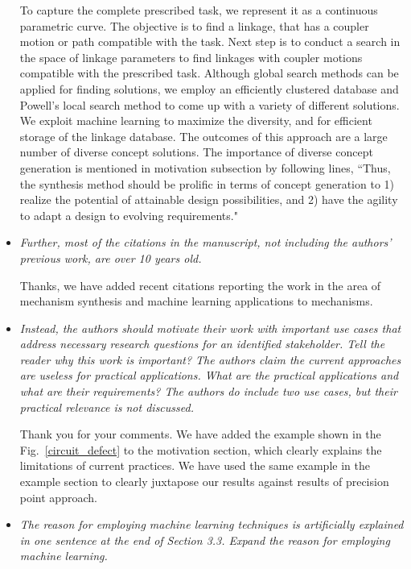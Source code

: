 \documentclass{article}
\begin{document}
\begin{itemize}
To capture the complete prescribed task, we represent it as a continuous parametric curve.
The objective is to find a linkage, that has a coupler motion or path compatible with the task.
Next step is to conduct a search in the space of linkage parameters to find linkages with coupler motions compatible with the prescribed task.
Although global search methods can be applied for finding solutions, we employ an efficiently clustered database and Powell's local search method to come up with a variety of different solutions.
We exploit machine learning to maximize the diversity, and for efficient storage of the linkage database.
The outcomes of this approach are a large number of diverse concept solutions.
The importance of diverse concept generation is mentioned in motivation subsection by following lines,
``Thus, the synthesis method should be prolific in terms of concept generation to 1) realize the potential of attainable design possibilities, and 2) have the agility to adapt a design to evolving requirements."
\\

  \item \emph{
Further, most of the citations in the manuscript, not including the authors' previous work, are over 10 years old.
}

Thanks, we have added recent citations reporting the work in the area of mechanism synthesis and machine learning applications to mechanisms.
\\

  \item \emph{
Instead, the authors should motivate their work with important use cases that address necessary research questions for an identified stakeholder. Tell the reader why this work is important? The authors claim the current approaches are useless for practical applications. What are the practical applications and what are their requirements? The authors do include two use cases, but their practical relevance is not discussed.
}

Thank you for your comments.
We have added the example shown in the Fig.~\ref{circuit_defect} to the motivation section, which clearly explains the limitations of current practices.
We have used the same example in the example section to clearly juxtapose our results against results of precision point approach.
\\

  \item \emph{
 The reason for employing machine learning techniques is artificially explained in one sentence at the end of Section 3.3. Expand the reason for employing machine learning.
}


\end{itemize}
\end{document}
